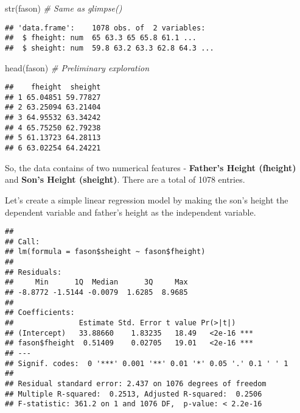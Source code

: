 \documentclass[
]{article}
\newenvironment{Shaded}{\begin{snugshade}}{\end{snugshade}}
\newcommand{\CommentTok}[1]{\textcolor[rgb]{0.56,0.35,0.01}{\textit{#1}}}
\newcommand{\FunctionTok}[1]{\textcolor[rgb]{0.00,0.00,0.00}{#1}}
\newcommand{\NormalTok}[1]{#1}
\newcommand{\OtherTok}[1]{\textcolor[rgb]{0.56,0.35,0.01}{#1}}
\newcommand{\SpecialCharTok}[1]{\textcolor[rgb]{0.00,0.00,0.00}{#1}}
\begin{document}
\begin{Shaded}
\begin{Highlighting}[]
\FunctionTok{str}\NormalTok{(fason) }\CommentTok{\# Same as glimpse()}
\end{Highlighting}
\end{Shaded}

\begin{verbatim}
## 'data.frame':    1078 obs. of  2 variables:
##  $ fheight: num  65 63.3 65 65.8 61.1 ...
##  $ sheight: num  59.8 63.2 63.3 62.8 64.3 ...
\end{verbatim}

\begin{Shaded}
\begin{Highlighting}[]
\FunctionTok{head}\NormalTok{(fason) }\CommentTok{\# Preliminary exploration}
\end{Highlighting}
\end{Shaded}

\begin{verbatim}
##    fheight  sheight
## 1 65.04851 59.77827
## 2 63.25094 63.21404
## 3 64.95532 63.34242
## 4 65.75250 62.79238
## 5 61.13723 64.28113
## 6 63.02254 64.24221
\end{verbatim}

So, the data contains of two numerical features - \textbf{Father's
Height (fheight)} and \textbf{Son's Height (sheight)}. There are a total
of 1078 entries.

Let's create a simple linear regression model by making the son's height
the dependent variable and father's height as the independent variable.

\begin{Shaded}
\end{Shaded}

\begin{verbatim}
## 
## Call:
## lm(formula = fason$sheight ~ fason$fheight)
## 
## Residuals:
##     Min      1Q  Median      3Q     Max 
## -8.8772 -1.5144 -0.0079  1.6285  8.9685 
## 
## Coefficients:
##               Estimate Std. Error t value Pr(>|t|)    
## (Intercept)   33.88660    1.83235   18.49   <2e-16 ***
## fason$fheight  0.51409    0.02705   19.01   <2e-16 ***
## ---
## Signif. codes:  0 '***' 0.001 '**' 0.01 '*' 0.05 '.' 0.1 ' ' 1
## 
## Residual standard error: 2.437 on 1076 degrees of freedom
## Multiple R-squared:  0.2513, Adjusted R-squared:  0.2506 
## F-statistic: 361.2 on 1 and 1076 DF,  p-value: < 2.2e-16
\end{verbatim}
\end{document}
